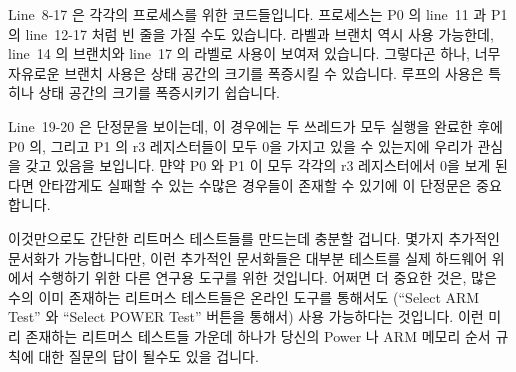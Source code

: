 Line~8-17 은 각각의 프로세스를 위한 코드들입니다.
프로세스는 P0 의 line~11 과 P1 의 line~12-17 처럼 빈 줄을 가질 수도 있습니다.
라벨과 브랜치 역시 사용 가능한데, line~14 의 브랜치와 line~17 의 라벨로 사용이
보여져 있습니다.
그렇다곤 하나, 너무 자유로운 브랜치 사용은 상태 공간의 크기를 폭증시킬 수
있습니다.
루프의 사용은 특히나 상태 공간의 크기를 폭증시키기 쉽습니다.

Line~19-20 은 단정문을 보이는데, 이 경우에는 두 쓰레드가 모두 실행을 완료한
후에 P0 의, 그리고 P1 의 r3 레지스터들이 모두 0을 가지고 있을 수 있는지에
우리가 관심을 갖고 있음을 보입니다.
먄약 P0 와 P1 이 모두 각각의 r3 레지스터에서 0을 보게 된다면 안타깝게도 실패할
수 있는 수많은 경우들이 존재할 수 있기에 이 단정문은 중요합니다.
\iffalse

Lines~8-17 are the lines of code for each process. A given process
can have empty lines, as is the case for P0's line~11 and P1's
lines~12-17.
Labels and branches are permitted, as demonstrated by the branch
on line~14 to the label on line~17. That said, too-free use of branches
will expand the state space. Use of loops is a particularly good way to
explode your state space.

Lines~19-20 show the assertion, which in this case indicates that we
are interested in whether P0's and P1's r3 registers can both contain
zero after both threads complete execution. This assertion is important
because there are a number of use cases that would fail miserably if
both P0 and P1 saw zero in their respective r3 registers.
\fi

이것만으로도 간단한 리트머스 테스트들를 만드는데 충분할 겁니다.
몇가지 추가적인 문서화가 가능합니다만, 이런 추가적인 문서화들은 대부분 테스트를
실제 하드웨어 위에서 수행하기 위한 다른 연구용 도구를 위한 것입니다.
어쩌면 더 중요한 것은, 많은 수의 이미 존재하는 리트머스 테스트들은 온라인
도구를 통해서도 (``Select ARM Test'' 와 ``Select POWER Test'' 버튼을 통해서)
사용 가능하다는 것입니다.
이런 미리 존재하는 리트머스 테스트들 가운데 하나가 당신의 Power 나 ARM 메모리
순서 규칙에 대한 질문의 답이 될수도 있을 겁니다.
\iffalse

This should give you enough information to construct simple litmus
tests. Some additional documentation is available, though much of this
additional documentation is intended for a different research tool that
runs tests on actual hardware. Perhaps more importantly, a large number of
pre-existing litmus tests are available with the online tool (available
via the ``Select ARM Test'' and ``Select POWER Test'' buttons). It is
quite likely that one of these pre-existing litmus tests will answer
your Power or ARM memory-ordering question.
\fi

